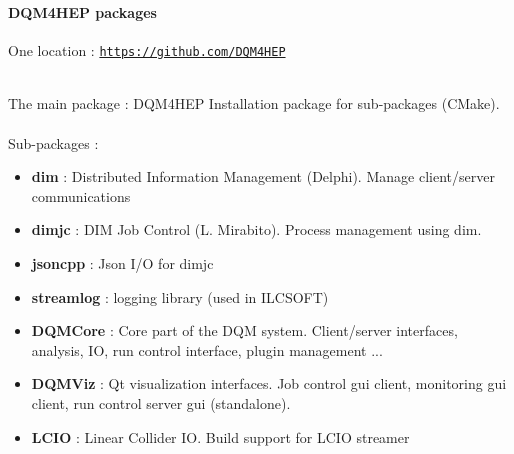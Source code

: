 \documentclass[8pt]{beamer}
\begin{document}
  
  \begin{frame}
    \frametitle{\secname}
    \framesubtitle{DQM4HEP packages}
    
    One location : \href{https://github.com/DQM4HEP}{\tt https://github.com/DQM4HEP} \\
    ~ \\
    \begin{block}{The main package : DQM4HEP}
      Installation package for sub-packages (CMake). \\
      ~ \\
      Sub-packages :
      \begin{itemize}
        \item \textbf{dim} : Distributed Information Management (Delphi). Manage client/server communications
        \item \textbf{dimjc} : DIM Job Control (L. Mirabito). Process management using dim.
        \item \textbf{jsoncpp} : Json I/O for dimjc
        \item \textbf{streamlog} : logging library (used in ILCSOFT)
        \item \textbf{DQMCore} : Core part of the DQM system. Client/server interfaces, analysis, IO, run control interface, plugin management ...
        \item \textbf{DQMViz} : Qt visualization interfaces. Job control gui client, monitoring gui client, run control server gui (standalone).
        \item \textbf{LCIO} : Linear Collider IO. Build support for LCIO streamer
      \end{itemize}
    \end{block}

  \end{frame}
  
\end{document}
